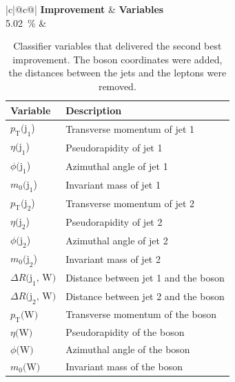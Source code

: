 \begin{table}[h]
    \centering
    \label{tab:app_vars_2}
    \caption{Classifier variables that delivered the second best improvement. The \PW boson coordinates were added, the distances between the jets and the leptons were removed.}
    \begin{tabular}{ |c|@{}c@{}| }
        \hline
        \textbf{Improvement} & \textbf{Variables}\\
        \hline
        \SI{5.02}{\%} & 
        \begin{tabular}{ll}
            \hline
            Variable & Description\\
            \hline
            $p_\text{T}\text{(j}_\text{1}$) & Transverse momentum of jet 1\\
            $\eta\text{(j}_\text{1}$) & Pseudorapidity of jet 1\\
            $\phi\text{(j}_\text{1}$) & Azimuthal angle of jet 1\\
            $m_0\text{(j}_\text{1}$) & Invariant mass of jet 1\\

            $p_\text{T}\text{(j}_\text{2}$) & Transverse momentum of jet 2\\
            $\eta\text{(j}_\text{2}$) & Pseudorapidity of jet 2\\
            $\phi\text{(j}_\text{2}$) & Azimuthal angle of jet 2\\
            $m_0\text{(j}_\text{2}$) & Invariant mass of jet 2\\

            $\Delta R \text{(j}_\text{1}\text{, W)}$ & Distance between jet 1 and the \PW boson\\
            $\Delta R \text{(j}_\text{2}\text{, W)}$ & Distance between jet 2 and the \PW boson\\

            $p_\text{T}\text{(W)}$ & Transverse momentum of the \PW boson\\
            $\eta\text{(W)}$ & Pseudorapidity of the \PW boson\\
            $\phi\text{(W)}$ & Azimuthal angle of the \PW boson\\
            $m_0\text{(W)}$ & Invariant mass of the \PW boson\\
            \hline
        \end{tabular}\\
        \hline
    \end{tabular}
\end{table}

